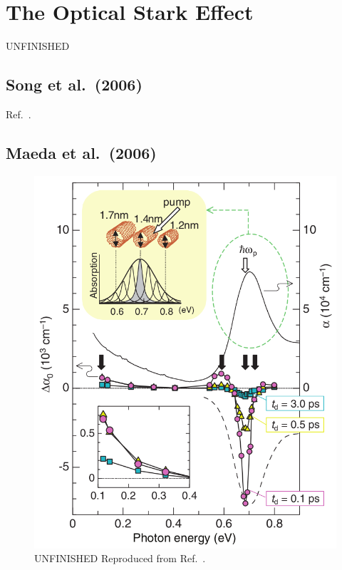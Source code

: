 \newpage

\section{The Optical Stark Effect}
{\color{red} UNFINISHED}

\subsection{Song et al.\ (2006)}
Ref.\ \cite{song2006optical}.

\subsection{Maeda et al.\ (2006)}

\begin{figure}[ht]
	\centering
	\includegraphics[scale=0.4]{images/chapter_prior_works/stark_shift_maeda}
	\caption{{\color{red} UNFINISHED} Reproduced from Ref.\ \cite{maeda2006gigantic}.}
\end{figure}

